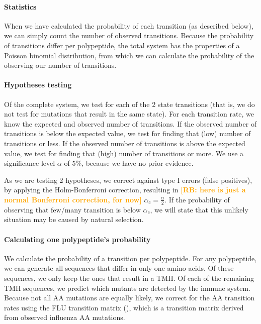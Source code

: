 \documentclass{article}
\newcommand{\richel}[1]{\textcolor{orange}{\textbf{[RB: #1]}}}
\begin{document}
\paragraph{Statistics}

When we have calculated the probability of each transition (as described below),
we can simply count the number of observed transitions.
Because the probability of transitions differ per polypeptide,
the total system has the properties of a Poisson binomial distribution,
from which we can calculate the probability of the observing our
number of transitions.

\paragraph{Hypotheses testing}

Of the complete system, we test for each of the 2 state transitions (that is,
we do not test for mutations that result in the same state).
For each transition rate, we know the expected and observed number
of transitions. If the observed number of transitions is below the expected
value, we test for finding that (low) number of transitions or less.
If the observed number of transitions is above the expected
value, we test for finding that (high) number of transitions or more.
We use a significance level $\alpha$ of 5\%, because we have no prior
evidence. 

As we are testing 2 hypotheses, 
we correct against type I errors (false positives), 
by applying the Holm-Bonferroni correction, 
resulting in \richel{here is just a normal Bonferroni correction, for now}
$\alpha_c = \frac{\alpha}{2}$.
If the probability of observing that few/many 
transition is below $\alpha_c$, we will state 
that this unlikely situation may be caused by natural selection.

\paragraph{Calculating one polypeptide's probability}

We calculate the probability of a transition per polypeptide.
For any polypeptide, we can generate all sequences that differ
in only one amino acids. Of these sequences, we only keep the ones
that result in a TMH. Of each of the remaining TMH sequences, we predict
which mutants are detected by the immune system. Because not all 
AA mutations are equally likely, we correct for the AA transition
rates using the FLU transition matrix (\cite{dang2010flu}),
which is a transition matrix derived from observed influenza AA mutations.
\end{document}
